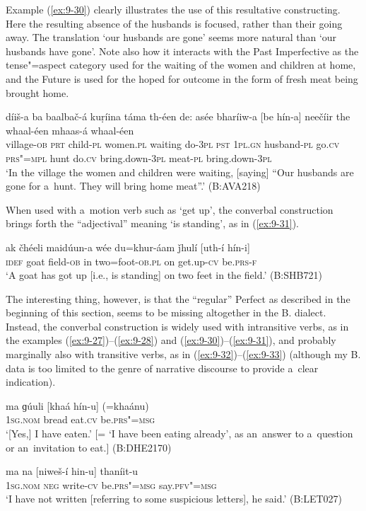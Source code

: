 Example (\ref{ex:9-30}) clearly illustrates the use of this resultative constructing. Here the resulting absence of the husbands is focused, rather than their going away. The translation `our husbands are gone' seems more natural than `our husbands have gone'. Note also how it interacts with the Past Imperfective as the tense"=aspect category used for the waiting of the women and children at home, and the Future is used for the hoped for outcome in the form of fresh meat being brought home.

\begin{exe}
\ex
\label{ex:9-30}
\gll díiš-a ba baalbač-á kuṛíina táma th-éen de: asée bharíiw-a [be hín-a] neečíir the whaal-éen mhaas-á whaal-éen \\
village-\textsc{ob} \textsc{prt} child-\textsc{pl} women.\textsc{pl} waiting  do-\textsc{3pl} \textsc{pst } \textsc{1pl.gn} husband-\textsc{pl} go.\textsc{cv} \textsc{prs"=mpl}  hunt do.\textsc{cv} bring.down-\textsc{3pl} meat-\textsc{pl} bring.down-\textsc{3pl} \\
\glt `In the village the women and children were waiting, [saying] ``Our husbands are gone for a~hunt. They will bring home meat''.' (B:AVA218)
\end{exe}

When used with a~motion verb such as `get up', the converbal construction brings forth the ``adjectival'' meaning `is standing', as in (\ref{ex:9-31}).

\begin{exe}
\ex
\label{ex:9-31}
\gll ak čhéeli maidúun-a wée du=khur-áam ǰhulí [uth-í hín-i] \\
\textsc{idef} goat field-\textsc{ob} in two=foot-\textsc{ob.pl} on get.up-\textsc{cv} be.\textsc{prs-f} \\
\glt `A goat has got up [i.e., is standing] on two feet in the field.' (B:SHB721)
\end{exe}

The interesting thing, however, is that the ``regular'' Perfect as described in the beginning of this section, seems to be missing altogether in the B. dialect. Instead, the converbal construction is widely used with intransitive verbs, as in the examples (\ref{ex:9-27})--(\ref{ex:9-28}) and (\ref{ex:9-30})--(\ref{ex:9-31}), and probably marginally also with transitive verbs, as in (\ref{ex:9-32})--(\ref{ex:9-33}) (although my B. data is too limited to the genre of narrative discourse to provide a~clear indication).

\begin{exe}
\ex
\label{ex:9-32}
\gll ma ɡúuli [khaá hín-u] (=khaánu)  \\
\textsc{1sg.nom} bread eat.\textsc{cv} be.\textsc{prs"=msg} \\
\glt `[Yes,] I have eaten.' [= `I have been eating already', as an~answer to a~question or an~invitation to eat.] (B:DHE2170)

\ex
\label{ex:9-33}
\gll ma na [niweš-í hin-u] thaníit-u  \\
\textsc{1sg.nom} \textsc{neg} write-\textsc{cv} be.\textsc{prs"=msg} say.\textsc{pfv"=msg} \\
\glt `I have not written [referring to some suspicious letters], he said.' (B:LET027)
\end{exe}

